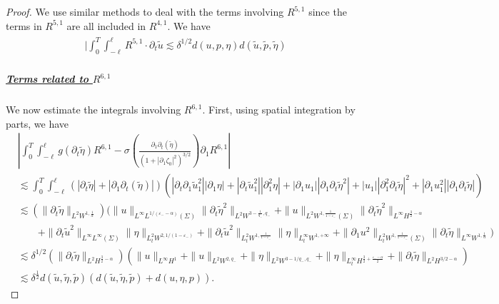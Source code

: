 \documentclass[letterpaper,reqno,10pt,twoside]{amsart}
\theoremstyle{definition}
\theoremstyle{remark}
\def\p{\partial}
\begin{document}
\begin{proof}
			We use similar methods to deal with the terms involving $R^{5,1}$ since the terms in $R^{5,1}$ are all included in $R^{4,1}$. We have
			\begin{align}
				\begin{aligned}
					|\int_0^T\int_{-\ell}^\ell R^{5,1}\cdot\p_t\tilde{u}\lesssim\delta^{1/2}d(u,p,\eta)d(\tilde{u},\tilde{p},\tilde{\eta})
				\end{aligned}
			\end{align}
			
			\subparagraph{\underline{Terms related to $R^{6,1}$}}
			We now estimate the integrals involving $R^{6,1}$. First, using spatial integration by parts, we have
			\begin{equation}\label{est:remain_b4}
				\begin{aligned}
					&|\int_0^T\int_{-\ell}^\ell g(\p_{t}\tilde{\eta})R^{6,1}-\sigma\left(\frac{\p_1\p_{t}(\tilde{\eta})}{(1+|\p_1\zeta_0|^2)^{3/2}}\right)\p_{1}R^{6,1}|\\
					&\lesssim\int_0^T\int_{-\ell}^\ell(|\p_{t}\tilde{\eta}|+|\p_1\p_{t}(\tilde{\eta})|)(|\p_{t}\p_{1}\tilde{u}_1^{2}||\p_1\eta|+|\p_{t}\tilde{u}_{1}^{2}||\p_{1}^{2}\eta|+|\p_{1}u_{1}||\p_{1}\p_{t}\tilde{\eta}^{2}|+|u_{1}||\p_{1}^{2}\p_{t}\tilde{\eta}|^{2}+|\p_{1}u_{1}^{2}||\p_{1}\p_{t}\tilde{\eta}|) \\
					&\lesssim(\|\p_{t}\tilde{\eta}\|_{L^{2}W^{1,\frac{1}{\alpha}}})(\|{u}\|_{L^{\infty}L^{1/(\varepsilon_--\alpha)}(\Sigma)}\|\p_t\tilde{\eta}^2\|_{L^{2}W^{3-\frac{1}{q_{-}},q_{-}}}+\|{u}\|_{L^{2}W^{1,\frac{1}{1-\varepsilon_{-}}}(\Sigma)}\|\p_t\tilde{\eta}^2\|_{L^{\infty}H^{\frac{3}{2}-\alpha}}\\
					&\quad\quad+\|\p_t\tilde{u}^2\|_{L^{\infty}L^\infty(\Sigma)}\|\eta\|_{L_{t}^{2}W^{2,1/(1-\varepsilon_-)}}+\|\p_{t}\tilde{u}^{2}\|_{L_{t}^{2}W^{1,\frac{1}{1-\varepsilon_{-}}}}\|\eta\|_{L_{t}^{\infty}W^{1,+\infty}}+\|\p_{1}{u}^{2}\|_{L_{t}^{2}W^{1,\frac{1}{1-\varepsilon_{-}}}(\Sigma)}\|\p_{t}\tilde{\eta}\|_{L^{\infty}W^{1,\frac{1}{\alpha}}})\\
					&\lesssim\delta^{1/2}(\|\p_{t}\tilde{\eta}\|_{L^2H^{\frac{3}{2}-\alpha}})(\|{u}\|_{L^\infty H^{1}}+\|u\|_{L^{2}W^{2,q_{-}}}+\|\eta\|_{L^2W^{3-1/q_-,q_-}}
					+\|\eta\|_{L_{t}^{\infty}H^{\frac{3}{2}+\frac{\varepsilon_{-}-\alpha}{2}}}+\|\p_t\tilde{\eta}\|_{L^2H^{3/2-\alpha}})\\
					&\lesssim \delta^{\frac{1}{2}}d(\tilde{u},\tilde{\eta},\tilde{p})(d(\tilde{u},\tilde{\eta},\tilde{p})+d({u},{\eta},{p})).
				\end{aligned}

\end{equation}
\end{proof}
\end{document}
